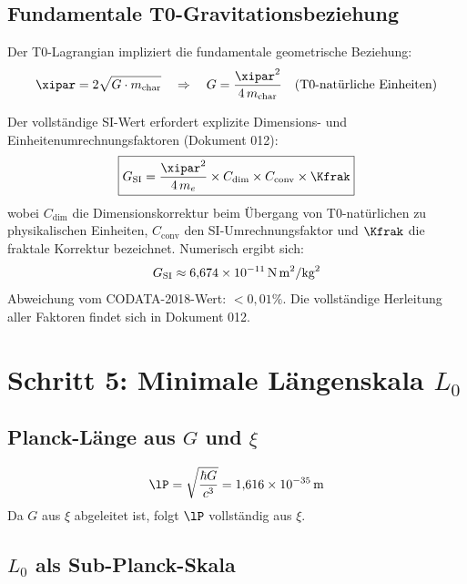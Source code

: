 \subsection{Fundamentale T0-Gravitationsbeziehung}

Der T0-Lagrangian impliziert die fundamentale geometrische Beziehung:
\begin{equation}
	\xipar = 2\sqrt{G \cdot m_{\text{char}}}
	\quad \Rightarrow \quad
	G = \frac{\xipar^2}{4\, m_{\text{char}}} \quad \text{(T0-natürliche Einheiten)}
\end{equation}

Der vollständige SI-Wert erfordert explizite Dimensions- und Einheitenumrechnungsfaktoren (Dokument 012):
\begin{equation}
	\boxed{G_{\text{SI}} = \frac{\xipar^2}{4\, m_e} \times C_{\text{dim}} \times C_{\text{conv}} \times \Kfrak}
	\label{eq:G_from_xi}
\end{equation}
wobei $C_{\text{dim}}$ die Dimensionskorrektur beim Übergang von T0-natürlichen zu physikalischen Einheiten, $C_{\text{conv}}$ den SI-Umrechnungsfaktor und $\Kfrak$ die fraktale Korrektur bezeichnet. Numerisch ergibt sich:
\begin{equation}
	G_{\text{SI}} \approx 6{,}674 \times 10^{-11}\,\text{N\,m}^2/\text{kg}^2
\end{equation}
Abweichung vom CODATA-2018-Wert: $< 0{,}01\%$. Die vollständige Herleitung aller Faktoren findet sich in Dokument 012.

\section{Schritt 5: Minimale Längenskala \texorpdfstring{$L_0$}{L0}}

\subsection{Planck-Länge aus $G$ und \texorpdfstring{$\xi$}{xi}}

\begin{equation}
	\lP = \sqrt{\frac{\hbar G}{c^3}} = 1{,}616 \times 10^{-35}\,\text{m}
\end{equation}
Da $G$ aus $\xi$ abgeleitet ist, folgt $\lP$ vollständig aus $\xi$.

\subsection{\texorpdfstring{$L_0$}{L0} als Sub-Planck-Skala}

